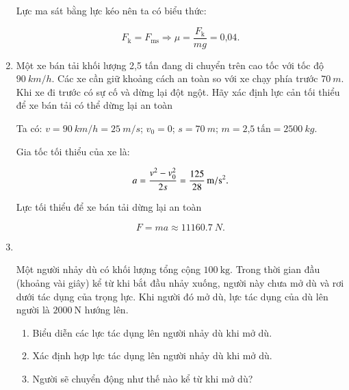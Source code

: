 \begin{enumerate}[label=\bfseries Bài \arabic*:,leftmargin=1.5cm]
	\hideall
	{
		Lực ma sát bằng lực kéo nên ta có biểu thức:
		
		$$F_\text{k} = F_\text{ms} \Rightarrow \mu = \dfrac{F_\text{k}}{mg} =\text{0,04}.$$
	}
	
		\item {}
	
	
	{ 
		Một xe bán tải khối lượng 2,5 tấn đang di chuyển trên cao tốc với tốc độ $\SI{90}{km/h}$. Các xe cần giữ khoảng cách an toàn so với xe chạy phía trước $\SI{70}{m}$. Khi xe đi trước có sự cố và dừng lại đột ngột. Hãy xác định lực cản tối thiểu để xe bán tải có thể dừng lại an toàn
		
	}
	
	\hideall
	{
		Ta có: $v = \SI{90}{km/h} = \SI{25}{m/s}$; $v_0 = 0$; $s = \SI{70}{m}$; $m = \text{2,5}\ \text{tấn} = \SI{2500}{kg}.$
		
		Gia tốc tối thiểu của xe là:
		
		$$a = \dfrac{v^2 - v_0^2}{2s} = \xsi{\dfrac{125}{28}}{m/s}^2.$$
		
		Lực tối thiểu để xe bán tải dừng lại an toàn
		
		$$F = ma \approx \SI{11160,7}{N}.$$
		
		
	}
	
	\item{}\\
	{Một người nhảy dù có khối lượng tổng cộng $\SI{100}{\kilogram}$. Trong thời gian đầu (khoảng vài giây) kể từ khi bắt đầu nhảy xuống, người này chưa mở dù và rơi dưới tác dụng của trọng lực. Khi người đó mở dù, lực tác dụng của dù lên người là $\SI{2000}{\newton}$ hướng lên.
		\begin{enumerate}[label=\alph*)]
			\item Biểu diễn các lực tác dụng lên người nhảy dù khi mở dù.
			\item Xác định hợp lực tác dụng lên người nhảy dù khi mở dù.
			\item Người sẽ chuyển động như thế nào kể từ khi mở dù?
		\end{enumerate}
	
}
\end{enumerate}
